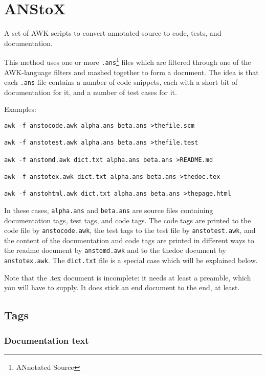\part{ANStoX}
\label{anstox}

A set of AWK scripts to convert annotated source to code, tests, and documentation.


This method uses one or more \texttt{.ans}\footnote{ANnotated Source} files which are filtered through one of the AWK-language filters and mashed together to form a document. The idea is that each \texttt{.ans} file contains a number of code snippets, each with a short bit of documentation for it, and a number of test cases for it.


Examples:

\begin{verbatim}
awk -f anstocode.awk alpha.ans beta.ans >thefile.scm

awk -f anstotest.awk alpha.ans beta.ans >thefile.test

awk -f anstomd.awk dict.txt alpha.ans beta.ans >README.md

awk -f anstotex.awk dict.txt alpha.ans beta.ans >thedoc.tex

awk -f anstohtml.awk dict.txt alpha.ans beta.ans >thepage.html
\end{verbatim}

In these cases, \texttt{alpha.ans} and \texttt{beta.ans} are source files containing documentation tags, test tags, and code tags. The code tags are printed to the code file by \texttt{anstocode.awk}, the test tags to the test file by \texttt{anstotest.awk}, and the content of the documentation and code tags are printed in different ways to the readme document by \texttt{anstomd.awk} and to the thedoc document by \texttt{anstotex.awk}. The \texttt{dict.txt} file is a special case which will be explained below.


Note that the .tex document is incomplete: it needs at least a preamble, which you will have to supply. It does stick an end document to the end, at least.

\chapter{Tags}
\label{tags}
\section{Documentation text}
\label{documentation-text}

